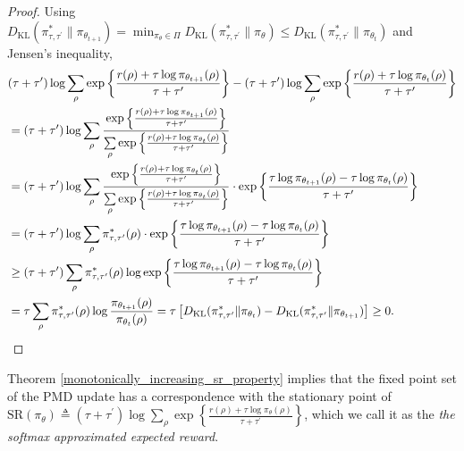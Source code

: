 \documentclass{article}
\newcommand{\KL}{D_{\text{KL}}}
\newcommand{\SR}{\text{SR}}
\newcommand{\pithetat}{\pi_{\theta_t}}
\begin{document}
\begin{proof}
Using $\KL(\pi_{\tau,\tau^{\prime}}^* \| \pi_{\theta_{t+1}}) = \min_{\pi_\theta \in \Pi}{ \KL(\pi_{\tau,\tau^{\prime}}^* \| \pi_\theta)} \le \KL(\pi_{\tau,\tau^{\prime}}^* \| \pithetat)$ and Jensen's inequality,
\begin{equation*}
\begin{split}
	&(\tau + \tau^{\prime}) \log{ \sum\limits_{\rho}{ \exp\left\{ \frac{r(\rho) + \tau \log{\pi_{\theta_{t+1}}(\rho)} }{\tau + \tau^{\prime}} \right\} }} - (\tau + \tau^{\prime}) \log{\sum\limits_{\rho}{  \exp\left\{ \frac{r(\rho) + \tau \log{\pithetat(\rho)} }{\tau + \tau^{\prime}} \right\} }} \\
	&= (\tau + \tau^{\prime}) \log{ \sum\limits_{\rho}{ \frac{  \exp\left\{ \frac{r(\rho) + \tau \log{\pi_{\theta_{t+1}}(\rho)} }{\tau + \tau^{\prime}} \right\}  }{ \sum\limits_{\rho}{  \exp\left\{ \frac{r(\rho) + \tau \log{\pithetat(\rho)} }{\tau + \tau^{\prime}} \right\} } }  } } \\
	&= (\tau + \tau^{\prime}) \log{ \sum\limits_{\rho}{ \frac{  \exp\left\{ \frac{r(\rho) + \tau \log{\pithetat(\rho)} }{\tau + \tau^{\prime}} \right\}  }{ \sum\limits_{\rho}{  \exp\left\{ \frac{r(\rho) + \tau \log{\pithetat(\rho)} }{\tau + \tau^{\prime}} \right\} } }  } \cdot \exp\left\{ \frac{\tau \log{\pi_{\theta_{t+1}}(\rho)} - \tau \log{\pithetat(\rho)} }{\tau + \tau^{\prime}} \right\} } \\
	&= (\tau + \tau^{\prime}) \log{ \sum\limits_{\rho}{ \pi_{\tau,\tau^{\prime}}^*(\rho) } \cdot \exp\left\{ \frac{\tau \log{\pi_{\theta_{t+1}}(\rho)} - \tau \log{\pithetat(\rho)} }{\tau + \tau^{\prime}} \right\} } \\
	&\ge (\tau + \tau^{\prime}) \sum\limits_{\rho}{ \pi_{\tau,\tau^{\prime}}^*(\rho) \log{ \exp\left\{ \frac{\tau \log{\pi_{\theta_{t+1}}(\rho)} - \tau \log{\pithetat(\rho)} }{\tau + \tau^{\prime}} \right\} } } \\
	&= \tau \sum\limits_{\rho}{ \pi_{\tau,\tau^{\prime}}^*(\rho) \log{ \frac{\pi_{\theta_{t+1}}(\rho)}{\pithetat(\rho)} } } = \tau \left[ \KL(\pi_{\tau,\tau^{\prime}}^* \| \pithetat) - \KL(\pi_{\tau,\tau^{\prime}}^* \| \pi_{\theta_{t+1}})\right] \ge 0. \qedhere
\end{split}
\end{equation*}
\end{proof}

Theorem \ref{monotonically_increasing_sr_property} implies that the fixed point set of the PMD update has a correspondence with the stationary point of $\SR(\pi_\theta) \triangleq (\tau + \tau^{\prime})\log{ \sum_{\rho}{ \exp\left\{ \frac{r(\rho) + \tau \log{\pi_\theta(\rho)} }{\tau + \tau^{\prime}} \right\} }}$, which we call it as the \textit{the softmax approximated expected reward}.
\end{document}
